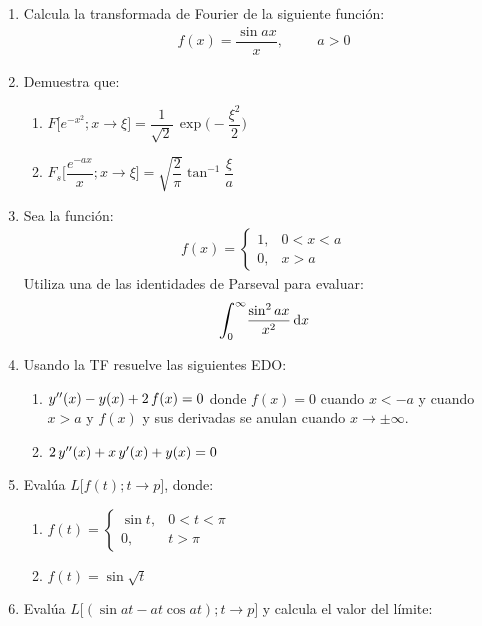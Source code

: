 \begin{enumerate}
\item Calcula la transformada de Fourier de la siguiente función:
\begin{align*}
f(x) = \dfrac{\sin a x}{x}, \hspace{1cm} a > 0
\end{align*}
\item Demuestra que:
\begin{enumerate}
\item $F \bigg[ e^{-x^{2}}; x \to \xi \bigg] = \dfrac{1}{\sqrt{2}} \, \exp\bigg( - \dfrac{\xi^{2}}{2} \bigg)$
\item $F_{s} \bigg[ \dfrac{e^{- a x}}{x}; x \to \xi \bigg] = \sqrt{\dfrac{2}{\pi}} \tan^{-1} \dfrac{\xi}{a}$
\end{enumerate}
\item Sea la función:
\begin{align*}
f(x) = \begin{cases}
1, & 0 < x < a \\
0, & x > a
\end{cases}
\end{align*}
Utiliza una de las identidades de Parseval para evaluar:
\begin{align*}
\scaleint{6ex}_{\bs 0}^{\infty} \dfrac{\sin^{2} a x}{x^{2}} \dd{x}
\end{align*}
\item Usando la TF resuelve las siguientes EDO:
\begin{enumerate}
\item ${y}^{\prime \prime}(x) - y (x) +  2 \, f(x) = 0$ donde $f(x) = 0$ cuando $x < -a$ y cuando $x > a$ y $f(x)$ y sus derivadas se anulan cuando $x \to \pm \infty$.
\item $2 \, {y}^{\prime \prime} (x) +  x \, {y}^{\prime} (x) + y(x) = 0$
\end{enumerate}
\item Evalúa $L \big[ f(t); t \to p \big]$, donde:
\begin{enumerate}
\item $f (t) = \begin{cases}
\sin t, & 0 < t < \pi \\
0, & t > \pi
\end{cases}$
\item $f (t) = \sin \sqrt{t}$
\end{enumerate}
\item Evalúa $L \big[ (\sin a t - a t \cos a t ); t \to p \big]$ y calcula el valor del límite:

\end{enumerate}
